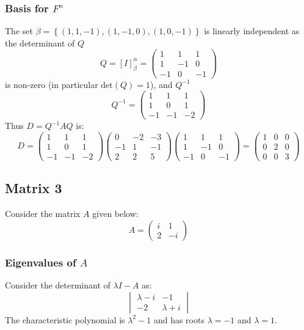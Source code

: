 \documentclass{article}[12pt]
\begin{document}
\subsubsection{Basis for $F^n$}
The set $\beta=\left\{(1,1,-1),(1,-1,0),(1,0,-1)\right\}$ 
is linearly independent as the determinant of $Q$
\[
Q = [I]_\beta^\alpha = \begin{pmatrix}
1 & 1 & 1 \\
1 & -1 & 0 \\
-1 & 0 & -1
\end{pmatrix}
\]
is non-zero (in particular $\textrm{det}(Q)=1$), and $Q^{-1}$
\[
Q^{-1} = \begin{pmatrix}
1 & 1 & 1\\
1 & 0 & 1\\
-1 & -1 & -2
\end{pmatrix}
\]
Thus $D=Q^{-1}AQ$ is:
\[
D = \begin{pmatrix}
1 & 1 & 1\\
1 & 0 & 1\\
-1 & -1 & -2
\end{pmatrix}
\begin{pmatrix}
0 & -2 & -3 \\
-1 & 1 & -1 \\
2 & 2 & 5
\end{pmatrix}
\begin{pmatrix}
1 & 1 & 1 \\
1 & -1 & 0 \\
-1 & 0 & -1
\end{pmatrix} 
= \begin{pmatrix}
1 & 0 & 0 \\
0 & 2 & 0 \\
0 & 0 & 3
\end{pmatrix}
\]

\subsection{Matrix 3}
Consider the matrix $A$ given below:
\[
A = \begin{pmatrix}
i & 1 \\
2 & -i
\end{pmatrix}
\]
\subsubsection{Eigenvalues of $A$}
Consider the determinant of $\lambda I - A$ as:
\[
\begin{vmatrix}
\lambda-i & -1 \\
-2 & \lambda+i
\end{vmatrix}
\]
The characteristic polynomial is $\lambda^2-1$ and has roots $\lambda=-1$
and $\lambda=1$.
\end{document}
